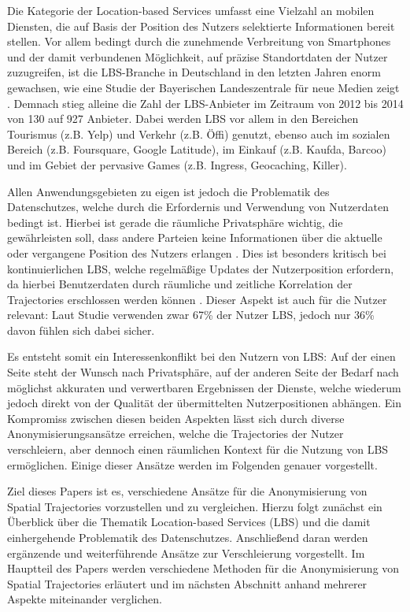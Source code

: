 Die Kategorie der Location-based Services umfasst eine Vielzahl an mobilen Diensten, die auf Basis der Position des Nutzers selektierte Informationen bereit stellen. Vor allem bedingt durch die zunehmende Verbreitung von Smartphones und der damit verbundenen Möglichkeit, auf präzise Standortdaten der Nutzer zuzugreifen, ist die LBS-Branche in Deutschland in den letzten Jahren enorm gewachsen, wie eine Studie der Bayerischen Landeszentrale für neue Medien zeigt \cite{Consulting2014}. Demnach stieg alleine die Zahl der LBS-Anbieter im Zeitraum von 2012 bis 2014 von 130 auf 927 Anbieter. Dabei werden LBS vor allem in den Bereichen Tourismus (z.B. Yelp) und Verkehr (z.B. Öffi) genutzt, ebenso auch im sozialen Bereich (z.B. Foursquare, Google Latitude), im Einkauf (z.B. Kaufda, Barcoo) und im Gebiet der pervasive Games (z.B. Ingress, Geocaching, Killer).

Allen Anwendungsgebieten zu eigen ist jedoch die Problematik des Datenschutzes, welche durch die Erfordernis und Verwendung von Nutzerdaten bedingt ist. Hierbei ist gerade die räumliche Privatsphäre wichtig, die gewährleisten soll, dass andere Parteien keine Informationen über die aktuelle oder vergangene Position des Nutzers erlangen \cite{Beresford2003}. Dies ist besonders kritisch bei kontinuierlichen LBS, welche regelmäßige Updates der Nutzerposition erfordern, da hierbei Benutzerdaten durch räumliche und zeitliche Korrelation der Trajectories erschlossen werden können \cite{Chow2011}. Dieser Aspekt ist auch für die Nutzer relevant: Laut Studie verwenden zwar 67\% der Nutzer LBS, jedoch nur 36\% davon fühlen sich dabei sicher.

Es entsteht somit ein Interessenkonflikt bei den Nutzern von LBS: Auf der einen Seite steht der Wunsch nach Privatsphäre, auf der anderen Seite der Bedarf nach möglichst akkuraten und verwertbaren Ergebnissen der Dienste, welche wiederum jedoch direkt von der Qualität der übermittelten Nutzerpositionen abhängen. Ein Kompromiss zwischen diesen beiden Aspekten lässt sich durch diverse Anonymisierungsansätze erreichen, welche die Trajectories der Nutzer verschleiern, aber dennoch einen räumlichen Kontext für die Nutzung von LBS ermöglichen. Einige dieser Ansätze werden im Folgenden genauer vorgestellt.

Ziel dieses Papers ist es, verschiedene Ansätze für die Anonymisierung von Spatial Trajectories vorzustellen und zu vergleichen. Hierzu folgt zunächst ein Überblick über die Thematik Location-based Services (LBS) und die damit einhergehende Problematik des Datenschutzes. Anschließend daran werden ergänzende und weiterführende Ansätze zur Verschleierung vorgestellt. Im Hauptteil des Papers werden verschiedene Methoden für die Anonymisierung von Spatial Trajectories erläutert und im nächsten Abschnitt anhand mehrerer Aspekte miteinander verglichen.
